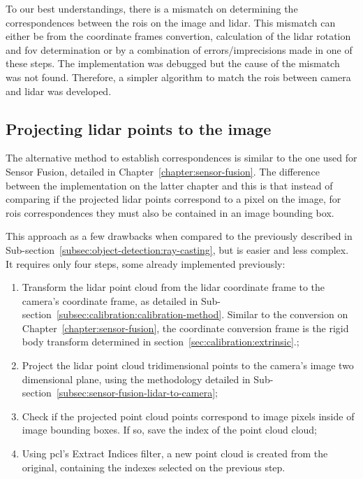 To our best understandings, there is a mismatch on determining the correspondences between the \acp{roi} on the image and \ac{lidar}. This mismatch can either be from the coordinate frames convertion, calculation of the \ac{lidar} rotation and \ac{fov} determination or by a combination of errors/imprecisions made in one of these steps. The implementation was debugged but the cause of the mismatch was not found. Therefore, a simpler algorithm to match the \acp{roi} between camera and \ac{lidar} was developed. 


\subsection{Projecting \ac{lidar} points to the image}
\label{subsec:object-detection:projection-correspondences}

The alternative method to establish correspondences is similar to the one used for Sensor Fusion, detailed in Chapter~\ref{chapter:sensor-fusion}. The difference between the implementation on the latter chapter and this is that instead of comparing if the projected \ac{lidar} points correspond to a pixel on the image, for \acp{roi} correspondences they must also be contained in an image bounding box. 

This approach as a few drawbacks when compared to the previously described in Sub-section~\ref{subsec:object-detection:ray-casting}, but is easier and less complex. It requires only four steps, some already implemented previously:

\begin{enumerate}
	\item Transform the \ac{lidar} point cloud from the \ac{lidar} coordinate frame to the camera's coordinate frame, as detailed in Sub-section~\ref{subsec:calibration:calibration-method}. Similar to the conversion on Chapter~\ref{chapter:sensor-fusion}, the coordinate conversion frame is the rigid body transform determined in section~\ref{sec:calibration:extrinsic}.;
	\item Project the \ac{lidar} point cloud tridimensional points to the camera's image two dimensional plane, using the methodology detailed in Sub-section~\ref{subsec:sensor-fusion-lidar-to-camera};
	\item Check if the projected point cloud points correspond to image pixels inside of image bounding boxes. If so, save the index of the point cloud cloud;
	\item Using \ac{pcl}'s Extract Indices filter, a new point cloud is created from the original, containing the indexes selected on the previous step.
\end{enumerate}

